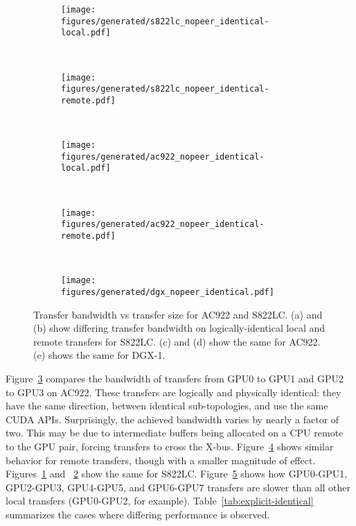 \begin{figure}[ht]
	\centering
	\begin{subfigure}[b]{0.4\textwidth}
		\texttt{[image: figures/generated/s822lc\_nopeer\_identical-local.pdf]}
		\caption{}
		\label{fig:explicit-nopeer-identical-s822lc-local}
	\end{subfigure}
	~
	\begin{subfigure}[b]{0.4\textwidth}
		\texttt{[image: figures/generated/s822lc\_nopeer\_identical-remote.pdf]}
		\caption{}
		\label{fig:explicit-nopeer-identical-s822lc-remote}
	\end{subfigure}
    \\
    \begin{subfigure}[b]{0.4\textwidth}
        \texttt{[image: figures/generated/ac922\_nopeer\_identical-local.pdf]}
        \caption{}
        \label{fig:explicit-nopeer-identical-ac922-local}
    \end{subfigure}
    ~
    \begin{subfigure}[b]{0.4\textwidth}
        \texttt{[image: figures/generated/ac922\_nopeer\_identical-remote.pdf]}
        \caption{}
        \label{fig:explicit-nopeer-identical-ac922-remote}
    \end{subfigure}
	\\
	\begin{subfigure}[b]{0.4\textwidth}
		\texttt{[image: figures/generated/dgx\_nopeer\_identical.pdf]}
		\caption{}
		\label{fig:explicit-nopeer-identical-dgx}
	\end{subfigure}
	\caption[GPU-GPU \texttt{cudaMemcpy} Bandwidth on Identical Links]{
		Transfer bandwidth vs transfer size for AC922 and S822LC.
		(a) and (b) show differing transfer bandwidth on logically-identical local and remote transfers for S822LC.
		(c) and (d) show the same for AC922.
		(e) shows the same for DGX-1.
	}
	\label{fig:explicit-nopeer-identical}
\end{figure}

Figure~\ref{fig:explicit-nopeer-identical-ac922-local} compares the bandwidth of transfers from GPU0 to GPU1 and GPU2 to GPU3 on AC922.
These transfers are logically and physically identical: they have the same direction, between identical sub-topologies, and use the same CUDA APIs.
Surprisingly, the achieved bandwidth varies by nearly a factor of two.
This may be due to intermediate buffers being allocated on a CPU remote to the GPU pair, forcing transfers to cross the X-bus.
Figure~\ref{fig:explicit-nopeer-identical-ac922-remote} shows similar behavior for remote transfers, though with a smaller magnitude of effect.
Figures~\ref{fig:explicit-nopeer-identical-s822lc-local} and ~\ref{fig:explicit-nopeer-identical-s822lc-remote} show the same for S822LC.
Figure~\ref{fig:explicit-nopeer-identical-dgx} shows how GPU0-GPU1, GPU2-GPU3, GPU4-GPU5, and GPU6-GPU7 transfers are slower than all other local transfers (GPU0-GPU2, for example).
Table~\ref{tab:explicit-identical} summarizes the cases where differing performance is observed.


